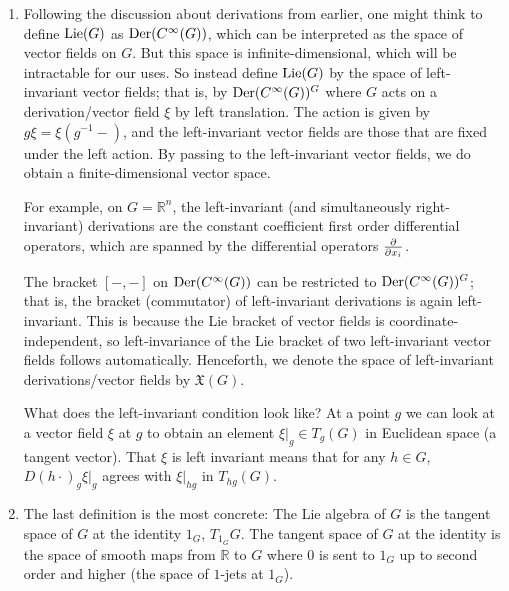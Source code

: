 \documentclass[../../rtnotes.tex]{subfiles}
\begin{document}
\begin{enumerate}
evaluated at some fixed time $t$. As $t$ increases, the terminal point should move along the curve defined by the commutator.
\item Following the discussion about derivations from earlier, one might think to define $\operatorname{Lie}(G)$ as $\operatorname{Der}(C^\infty(G))$, which can be interpreted as the space of vector fields on $G$. But this space is infinite-dimensional, which will be intractable for our uses. So instead define $\operatorname{Lie}(G)$ by the space of left-invariant vector fields; that is, by $\operatorname{Der}(C^\infty(G))^G$ where $G$ acts on a derivation/vector field $\xi$ by left translation. The action is given by $g\xi = \xi(g^{-1} - )$, and the left-invariant vector fields are those that are fixed under the left action. By passing to the left-invariant vector fields, we do obtain a finite-dimensional vector space. 

For example, on $G = \mathbb R^n$, the left-invariant (and simultaneously right-invariant) derivations are the constant coefficient first order differential operators, which are spanned by the differential operators $\pdv{x_i}$.

The bracket $[-,-]$ on $\operatorname{Der}(C^\infty(G))$ can be restricted to $\operatorname{Der}(C^\infty(G))^G$; that is, the bracket (commutator) of left-invariant derivations is again left-invariant. This is because the Lie bracket of vector fields is coordinate-independent, so left-invariance of the Lie bracket of two left-invariant vector fields follows automatically. Henceforth, we denote the space of left-invariant derivations/vector fields by $\mathfrak X(G)$.

What does the left-invariant condition look like? At a point $g$ we can look at a vector field $\xi$ at $g$ to obtain an element $\xi|_g\in T_g(G)$ in Euclidean space (a tangent vector). That $\xi$ is left invariant means that for any $h\in G$, $D(h\cdot)_g\xi|_g$ agrees with $\xi|_{hg}$ in $T_{hg}(G)$.
\begin{figure}[h]
  \centering
\end{figure}

\item The last definition is the most concrete: The Lie algebra of $G$ is the tangent space of $G$ at the identity $1_G$, $T_{1_G}G$. The tangent space of $G$ at the identity is the space of smooth maps from $\mathbb R$ to $G$ where $0$ is sent to $1_G$ up to second order and higher (the space of $1$-jets at $1_G$).
\end{enumerate}
\end{document}
